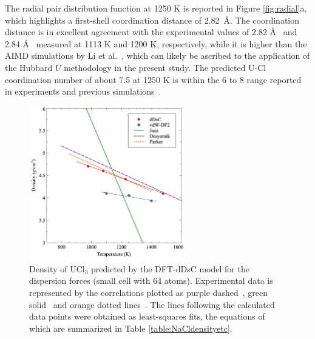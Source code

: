 \documentclass[preprint,3p,10pt,onecolumn,number,sort&compress]{elsarticle}
\begin{document}
The radial pair distribution function at 1250 K is reported in Figure \ref{fig:radial}a, which highlights a first-shell coordination distance of 2.82~\AA. The coordination distance is in excellent agreement with the experimental values of 2.82 \AA~\cite{Neilson} and 2.84 \AA~\cite{Okamoto} measured at 1113 K and 1200 K, respectively, while it is higher than the AIMD simulations by Li et al.~\cite{Li}, which can likely be ascribed to the application of the Hubbard $U$ methodology in the present study. The predicted U-Cl coordination number of about 7.5 at 1250 K is within the 6 to 8 range reported in experiments and previous simulations~\cite{Li,Neilson,Okamoto}. 

\begin{figure}[htb]
\centering
\includegraphics[width=0.6\textwidth]{fig5.jpg}
\caption{Density of UCl$_3$ predicted by the DFT-dDsC model for the dispersion forces (small cell with 64 atoms). Experimental data is represented by the correlations plotted as purple dashed~\cite{Desyatnik}, green solid~\cite{Janz1988} and orange dotted lines~\cite{Parker}. The lines following the calculated data points were obtained as least-squares fits, the equations of which are summarized in Table \ref{table:NaCldensityetc}.}  
\label{fig:UCl3density}
\end{figure}
\end{document}
